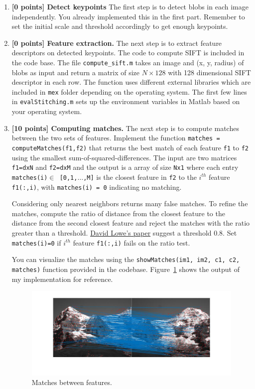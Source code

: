 \documentclass[10pt,letterpaper]{article}
\newcommand{\cmd}[1] {{\color{blue}\texttt{#1}}}
\begin{document}
\begin{enumerate}

\item \textbf{[0 points] Detect keypoints} The first step is to detect blobs in each image independently. You already implemented this in the first part. Remember to set the initial scale and threshold accordingly to get enough keypoints.
      
\item \textbf{[0 points] Feature extraction.} The next step is to extract feature descriptors on detected keypoints. The code to compute SIFT is included in the code base. The file \cmd{compute\_sift.m} takes an image and (x, y, radius) of blobs as input and return a matrix of size $N \times 128$ with 128 dimensional SIFT descriptor in each row. The function uses different external libraries which are included in \cmd{mex} folder depending on the operating system. The first few lines in \cmd{evalStitching.m} sets up the environment variables in Matlab based on your operating system.

\item \textbf{[10 points] Computing matches.} The next step is to compute matches between the two sets of features. Implement the function \cmd{matches = computeMatches(f1,f2)} that returns the best match of each feature \cmd{f1} to \cmd{f2} using the smallest sum-of-squared-differences. The input are two matrices \cmd{f1=dxN} and \cmd{f2=dxM} and the output is a array of size \cmd{Nx1} where each entry \cmd{matches(i)$\in$ [0,1,$\dots$,M]} is the closest feature in \cmd{f2} to the $i^{th}$ feature \cmd{f1(:,i)}, with \cmd{matches(i) = 0} indicating no matching.

Considering only nearest neighbors returns many false matches. To refine the matches, compute the ratio of distance from the closest feature to the distance from the second closest feature and reject the matches with the ratio greater than a threshold. \href{http://www.cs.ubc.ca/~lowe/papers/ijcv04.pdf}{David Lowe's paper} suggest a threshold 0.8. Set \cmd{matches(i)=0} if $i^{th}$ feature \cmd{f1(:,i)} fails on the ratio test.

You can visualize the matches using the \cmd{showMatches(im1, im2, c1, c2, matches)} function provided in the codebase. Figure~\ref{fig:match} shows the output of my implementation for reference.

\begin{figure}[h]
\centering
\includegraphics[width=0.95\linewidth]{./fig/matched.jpg}
\vspace{-0.6in}
\caption{\label{fig:match} Matches between features.}
\end{figure}


\end{enumerate}
\end{document}
